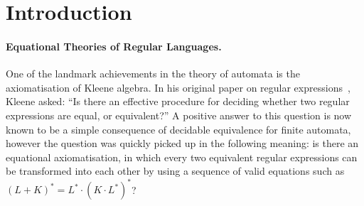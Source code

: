\section{Introduction}\label{sec:intro}
\paragraph*{Equational Theories of Regular Languages.}
One of the landmark achievements in the theory of automata is the axiomatisation of Kleene algebra. In his original paper on regular expressions~\cite[p.~32]{Kleene1956}, Kleene asked: ``Is there an effective procedure for deciding whether two regular expressions are equal, or equivalent?'' A positive answer to this question is now  known to be a simple consequence of decidable equivalence for finite automata, however the question was quickly picked up in the following meaning: is there an equational axiomatisation, in which every two equivalent regular expressions can be transformed into each other by using a sequence of valid equations such as  $(L +K)^* = L^* \cdot (K  \cdot L^*)^*$? 


